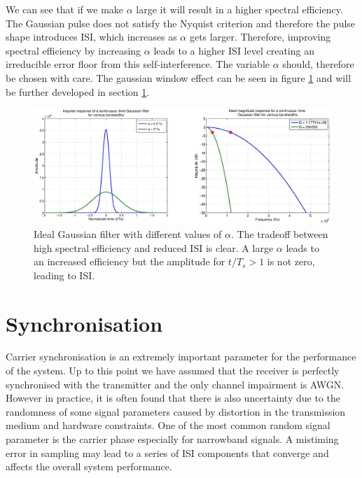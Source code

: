 \documentclass[12pt,a4paper,openright]{report}
\begin{document}
We can see that if we make $\alpha$ large it will result in a higher spectral efficiency. The Gaussian pulse does not satisfy the Nyquist criterion and therefore the pulse shape introduces ISI, which increases as $\alpha$ gets larger. Therefore, improving spectral efficiency by increasing $\alpha$ leads to a higher ISI level creating an irreducible error floor from this self-interference. The variable $\alpha$ should, therefore be chosen with care. The gaussian window effect can be seen in figure \ref{fig:gaussianalpha} and will be further developed in section \ref{sec:ts}.

 \begin{figure}[H]
  \centering
    \includegraphics[width=1\textwidth]{gausswinalpha.eps}
    \caption[Ideal Gaussian filter with different values of $\alpha$]{Ideal Gaussian filter with different values of $\alpha$. The tradeoff between high spectral efficiency and reduced ISI is clear. A large $\alpha$ leads to an increased efficiency but the amplitude for $t/T_s > 1$ is not zero, leading to ISI.}
    \label{fig:gaussianalpha}
\end{figure}  

\section{Synchronisation}
\label{sec:ts}

Carrier synchronisation is an extremely important parameter for the performance of the system. Up to this point we have assumed that the receiver is perfectly synchronised with the transmitter and the only channel impairment is AWGN. However in practice, it is often found that there is also uncertainty due to the randomness of some signal parameters caused by distortion in the transmission medium and hardware constraints. One of the most common random signal parameter is the carrier phase especially for narrowband signals. A mistiming error in sampling may lead to a series of ISI components that converge and affects the overall system performance. 
\end{document}
